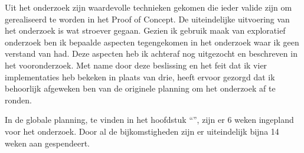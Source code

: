 Uit het onderzoek zijn waardevolle technieken gekomen die ieder valide zijn om gerealiseerd te worden in het Proof of Concept. De uiteindelijke uitvoering van het onderzoek is wat stroever gegaan. Gezien ik gebruik maak van exploratief onderzoek ben ik bepaalde aspecten tegengekomen in het onderzoek waar ik geen verstand van had. Deze aspecten heb ik achteraf nog uitgezocht en beschreven in het vooronderzoek. Met name door deze beslissing en het feit dat ik vier implementaties heb bekeken in plaats van drie, heeft ervoor gezorgd dat ik behoorlijk afgeweken ben van de originele planning om het onderzoek af te ronden.

In de globale planning, te vinden in het hoofdstuk ``'', zijn er 6 weken ingepland voor het onderzoek. Door al de bijkomstigheden zijn er uiteindelijk bijna 14 weken aan gespendeert.



